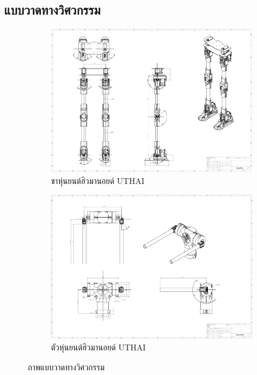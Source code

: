 \subsection{แบบวาดทางวิศวกรรม}
\begin{figure}[h!]
  \centering
  \begin{subfigure}[b]{0.45\linewidth}
    \includegraphics[width=\linewidth]{chapter4/images/uthai_drawing_leg.png}
    \caption{ขาหุ่นยนต์ฮิวมานอยด์ UTHAI}
  \end{subfigure}
  \begin{subfigure}[b]{0.45\linewidth}
    \includegraphics[width=\linewidth]{chapter4/images/uthai_drawing_body.png}
    \caption{ตัวหุ่นยนต์ฮิวมานอยด์ UTHAI}
  \end{subfigure}
  \caption{ภาพแบบวาดทางวิศวกรรม}
  \label{fig:barefoot_compilation}
\end{figure}
